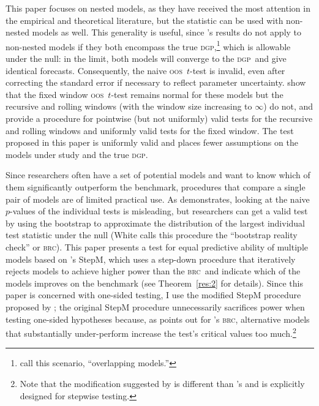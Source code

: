 \documentclass[10pt,fleqn,draft]{article}
\newcommand\citepos[2][]{\citeauthor{#2}'s \citeyearpar[#1]{#2}}
\theoremstyle{definition}
\newcommand{\brc}{\textsc{brc}}
\newcommand{\dgp}{\textsc{dgp}}
\newcommand{\oos}{\textsc{oos}}
\begin{document}
This paper focuses on nested models, as they have received the most
attention in the empirical and theoretical literature, but the
statistic can be used with non-nested models as well.  This generality
is useful, since \citepos{Wes:96} results do not apply to non-nested
models if they both encompass the true \dgp,\footnote{\citet{ClM:11b}
  call this scenario, ``overlapping models.''} which is allowable
under the null: in the limit, both models will converge to the \dgp\
and give identical forecasts.  Consequently, the naive \oos\ $t$-test
is invalid, even after correcting the standard error if necessary to
reflect parameter uncertainty.  \citet{ClM:11b} show that the fixed
window \oos\ $t$-test remains normal for these models but the
recursive and rolling windows (with the window size increasing to
$\infty$) do not, and provide a procedure for pointwise (but not
uniformly) valid tests for the recursive and rolling windows and
uniformly valid tests for the fixed window.  The test proposed in this
paper is uniformly valid and places fewer assumptions on the models
under study and the true \dgp.

Since researchers often have a set of potential models and want to
know which of them significantly outperform the benchmark, procedures
that compare a single pair of models are of limited practical use.  As
\citet{Whi:00} demonstrates, looking at the naive $p$-values of the
individual tests is misleading, but researchers can get a valid test
by using the bootstrap to approximate the distribution of the largest
individual test statistic under the null (White calls this procedure
the ``bootstrap reality check'' or \brc).  This paper presents a test
for equal predictive ability of multiple models based on
\citepos{RoW:05} StepM, which uses a step-down procedure that
iteratively rejects models to achieve higher power than the \brc\ and
indicate which of the models improves on the benchmark (see
Theorem~\ref{res:2} for details).  Since this paper is concerned with
one-sided testing, I use the modified StepM procedure proposed by
\citet{Cal:11e}; the original StepM procedure unnecessarily sacrifices
power when testing one-sided hypotheses because, as \citet{Han:05}
points out for \citepos{Whi:00} \brc, alternative models that
substantially under-perform increase the test's critical values too
much.\footnote{Note that the modification suggested by \citet{Cal:11e}
  is different than \citepos{Han:05} and is explicitly designed for
  stepwise testing.}
\end{document}
